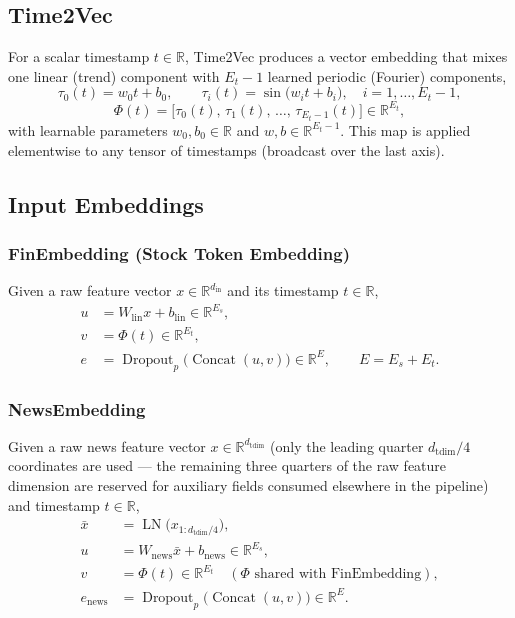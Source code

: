 \documentclass[stu,floatsintext]{apa7}
\newcommand{\R}{\mathbb{R}}
\newcommand{\LN}{\operatorname{LN}}
\newcommand{\Concat}{\operatorname{Concat}}
\begin{document}
\subsection{Time2Vec}

For a scalar timestamp $t\in\R$, Time2Vec produces a vector embedding that mixes one linear (trend)
component with $E_t-1$ learned periodic (Fourier) components,
\begin{equation}
  \tau_0(t) = w_0 t + b_0, \qquad
  \tau_i(t) = \sin\bigl(w_i t + b_i\bigr), \quad i=1,\dots,E_t-1,
\end{equation}
\begin{equation}
  \Phi(t) = \bigl[\tau_0(t),\,\tau_1(t),\,\dots,\,\tau_{E_t-1}(t)\bigr]\in\R^{E_t},
\end{equation}
with learnable parameters $w_0,b_0\in\R$ and $w,b\in\R^{E_t-1}$. This map is applied elementwise to any
tensor of timestamps (broadcast over the last axis).

\subsection{Input Embeddings}

\subsubsection{FinEmbedding (Stock Token Embedding)}

Given a raw feature vector $x\in\R^{d_{\mathrm{in}}}$ and its timestamp $t\in\R$,
\begin{align}
  u &= W_{\mathrm{lin}} x + b_{\mathrm{lin}} \in\R^{E_s}, \\
  v &= \Phi(t)\in\R^{E_t}, \\
  e &= \operatorname{Dropout}_p\bigl(\Concat(u,v)\bigr)\in\R^{E}, \qquad E=E_s+E_t.
\end{align}

\subsubsection{NewsEmbedding}

Given a raw news feature vector $x\in\R^{d_{\text{tdim}}}$ (only the leading quarter $d_{\text{tdim}}/4$ coordinates are used —
the remaining three quarters of the raw feature dimension are reserved for auxiliary fields consumed
elsewhere in the pipeline) and timestamp $t\in\R$,
\begin{align}
  \bar x &= \LN\bigl(x_{1:d_{\text{tdim}}/4}\bigr), \\
  u &= W_{\mathrm{news}}\bar x + b_{\mathrm{news}} \in\R^{E_s}, \\
  v &= \Phi(t)\in\R^{E_t} \quad(\Phi \text{ shared with FinEmbedding}), \\
  e_{\mathrm{news}} &= \operatorname{Dropout}_p\bigl(\Concat(u,v)\bigr)\in\R^{E}.
\end{align}
\end{document}
